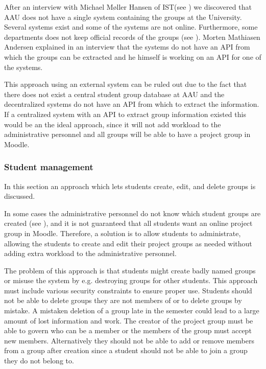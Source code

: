 After an interview with Michael Møller Hansen of IST(see ) we discovered that AAU does not have a single system containing the groups at the University.
Several systems exist and some of the systems are not online.
Furthermore, some departments does not keep official records of the groups (see ).
Morten Mathiasen Andersen explained in an interview that the systems do not have an API from which the groups can be extracted and he himself is working on an API for one of the systems.

This approach using an external system can be ruled out due to the fact that there does not exist a central student group database at AAU and the decentralized systems do not have an API from which to extract the information.
If a centralized system with an API to extract group information existed this would be an the ideal approach, since it will not add workload to the administrative personnel and all groups will be able to have a project group in Moodle. 



\subsubsection{Student management}
In this section an approach which lets students create, edit, and delete groups is discussed. 

In some cases the administrative personnel do not know which student groups are created (see ), and it is not guaranteed that all students want an online project group in Moodle. 
Therefore, a solution is to allow students to administrate, allowing the students to create and edit their project groups as needed without adding extra workload to the administrative personnel.

The problem of this approach is that students might create badly named groups or misuse the system by e.g. destroying groups for other students. 
This approach must include various security constraints to ensure proper use. 
Students should not be able to delete groups they are not members of or to delete groups by mistake. 
A mistaken deletion of a group late in the semester could lead to a large amount of lost information and work. 
The creator of the project group must be able to govern who can be a member or the members of the group must accept new members.
Alternatively they should not be able to add or remove members from a group after creation since a student should not be able to join a group they do not belong to. 



